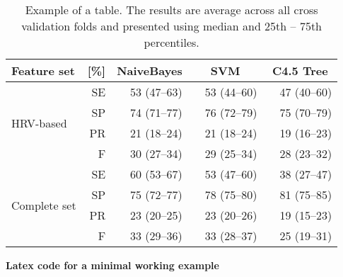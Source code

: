 \documentclass[a4paper,11pt,oneside]{report}
\newcommand{\drawBox}[3]
{
\begin{tikzpicture}
\def\w{1.5} %
\def\x{#1/100*\w} %
\def\xl{#2/100*\w} %
\def\xu{#3/100*\w} %
\filldraw[fill=gray!#1!white!, draw=black] (0,0) rectangle (\x,0.2); %
\draw [gray] (0,0) rectangle (\w,0.2); %
\draw (\x,0.1) -- (\xu,0.1) -- (\xu,0.15) -- (\xu,0.05); %
\draw (\x,0.1) -- (\xl,0.1) -- (\xl,0.15) -- (\xl,0.05); %
\end{tikzpicture} 
}
\newcommand{\boxNumberConf}[3]
{\drawBox{#1}{#2}{#3} & #1 (#2--#3)} %
\begin{document}
\begin{table}[ht!]\small
\centering
\caption{\label{tab:classification_feature_sel} Example of a table. The results are average across all cross validation folds and presented using median and 25th -- 75th percentiles.}

\begin{tabular}{p{1.5cm} r lr lr lr}
\toprule
Feature set&[\%]&  \multicolumn{2}{c}{NaiveBayes} &  \multicolumn{2}{c}{SVM} & \multicolumn{2}{c}{C4.5 Tree}\\
\midrule
\multirow{4}{1.5cm}{HRV-based} 
&SE & \boxNumberConf{53}{47}{63} &  \boxNumberConf{53}{44}{60} & \boxNumberConf{47}{40}{60}\\
&SP & \boxNumberConf{74}{71}{77} &  \boxNumberConf{76}{72}{79} & \boxNumberConf{75}{70}{79}\\
&PR & \boxNumberConf{21}{18}{24} &  \boxNumberConf{21}{18}{24} & \boxNumberConf{19}{16}{23}\\
&F  & \boxNumberConf{30}{27}{34} &  \boxNumberConf{29}{25}{34} & \boxNumberConf{28}{23}{32}\\
\midrule
\multirow{4}{1.5cm}{Complete set}
&SE & \boxNumberConf{60}{53}{67} &  \boxNumberConf{53}{47}{60} & \boxNumberConf{38}{27}{47}\\
&SP & \boxNumberConf{75}{72}{77} &  \boxNumberConf{78}{75}{80} & \boxNumberConf{81}{75}{85}\\
&PR & \boxNumberConf{23}{20}{25} &  \boxNumberConf{23}{20}{26} & \boxNumberConf{19}{15}{23}\\
&F  & \boxNumberConf{33}{29}{36} &  \boxNumberConf{33}{28}{37} & \boxNumberConf{25}{19}{31}\\
\bottomrule
\end{tabular}
\end{table}

\newpage
\noindent \textbf{Latex code for a minimal working example}
\end{document}
